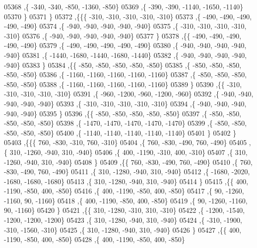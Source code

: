 \begin{DoxyCode}
05368     ,\{  -340,  -340,  -850, -1360,  -850\}
05369     ,\{  -390,  -390, -1140, -1650, -1140\}
05370     \}
05371    \}
05372   ,\{\{\{  -310,  -310,  -310,  -310,  -310\}
05373     ,\{  -490,  -490,  -490,  -490,  -490\}
05374     ,\{  -940,  -940,  -940,  -940,  -940\}
05375     ,\{  -310,  -310,  -310,  -310,  -310\}
05376     ,\{  -940,  -940,  -940,  -940,  -940\}
05377     \}
05378    ,\{\{  -490,  -490,  -490,  -490,  -490\}
05379     ,\{  -490,  -490,  -490,  -490,  -490\}
05380     ,\{  -940,  -940,  -940,  -940,  -940\}
05381     ,\{ -1440, -1680, -1440, -1680, -1440\}
05382     ,\{  -940,  -940,  -940,  -940,  -940\}
05383     \}
05384    ,\{\{  -850,  -850,  -850,  -850,  -850\}
05385     ,\{  -850,  -850,  -850,  -850,  -850\}
05386     ,\{ -1160, -1160, -1160, -1160, -1160\}
05387     ,\{  -850,  -850,  -850,  -850,  -850\}
05388     ,\{ -1160, -1160, -1160, -1160, -1160\}
05389     \}
05390    ,\{\{  -310,  -310,  -310,  -310,  -310\}
05391     ,\{  -960, -1200,  -960, -1200,  -960\}
05392     ,\{  -940,  -940,  -940,  -940,  -940\}
05393     ,\{  -310,  -310,  -310,  -310,  -310\}
05394     ,\{  -940,  -940,  -940,  -940,  -940\}
05395     \}
05396    ,\{\{  -850,  -850,  -850,  -850,  -850\}
05397     ,\{  -850,  -850,  -850,  -850,  -850\}
05398     ,\{ -1470, -1470, -1470, -1470, -1470\}
05399     ,\{  -850,  -850,  -850,  -850,  -850\}
05400     ,\{ -1140, -1140, -1140, -1140, -1140\}
05401     \}
05402    \}
05403   ,\{\{\{   760,  -830,  -310,   760,  -310\}
05404     ,\{   760,  -830,  -490,   760,  -490\}
05405     ,\{   310, -1260,  -940,   310,  -940\}
05406     ,\{   400, -1190,  -310,   400,  -310\}
05407     ,\{   310, -1260,  -940,   310,  -940\}
05408     \}
05409    ,\{\{   760,  -830,  -490,   760,  -490\}
05410     ,\{   760,  -830,  -490,   760,  -490\}
05411     ,\{   310, -1280,  -940,   310,  -940\}
05412     ,\{ -1680, -2020, -1680, -1680, -1680\}
05413     ,\{   310, -1280,  -940,   310,  -940\}
05414     \}
05415    ,\{\{   400, -1190,  -850,   400,  -850\}
05416     ,\{   400, -1190,  -850,   400,  -850\}
05417     ,\{    90, -1260, -1160,    90, -1160\}
05418     ,\{   400, -1190,  -850,   400,  -850\}
05419     ,\{    90, -1260, -1160,    90, -1160\}
05420     \}
05421    ,\{\{   310, -1280,  -310,   310,  -310\}
05422     ,\{ -1200, -1540, -1200, -1200, -1200\}
05423     ,\{   310, -1280,  -940,   310,  -940\}
05424     ,\{  -310, -1900,  -310, -1560,  -310\}
05425     ,\{   310, -1280,  -940,   310,  -940\}
05426     \}
05427    ,\{\{   400, -1190,  -850,   400,  -850\}
05428     ,\{   400, -1190,  -850,   400,  -850\}

\end{DoxyCode}
